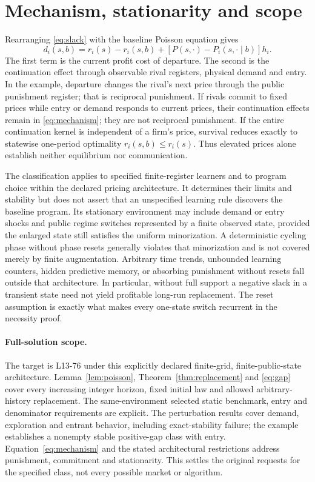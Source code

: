 \documentclass[11pt,a4paper]{article}
\begin{document}
\section{Mechanism, stationarity and scope}
Rearranging \eqref{eq:slack} with the baseline Poisson equation gives
\begin{equation}\label{eq:mechanism}
 d_i(s,b)=r_i(s)-r_i(s,b)
       +[P(s,\cdot)-P_i(s,\cdot\mid b)]h_i.
\end{equation}
The first term is the current profit cost of departure. The second is the
continuation effect through observable rival registers, physical demand and
entry. In the example, departure changes the rival's next price through the
public punishment register; that is reciprocal punishment. If rivals commit
to fixed prices while entry or demand responds to current prices, their
continuation effects remain in \eqref{eq:mechanism}; they are not reciprocal
punishment. If the entire continuation kernel is independent of a firm's
price, survival reduces exactly to statewise one-period optimality
$r_i(s,b)\leq r_i(s)$. Thus elevated prices alone establish neither equilibrium
nor communication.

The classification applies to specified finite-register learners and to program
choice within the declared pricing architecture. It determines their limits
and stability but does not assert that an unspecified learning rule discovers
the baseline program. Its stationary environment may include demand or entry
shocks and public regime switches represented by a finite observed state,
provided the enlarged state still satisfies the uniform minorization.
A deterministic cycling phase without phase resets generally violates that
minorization and is not covered merely by finite augmentation.
Arbitrary time trends, unbounded learning counters,
hidden predictive memory, or absorbing punishment without resets fall outside
that architecture. In particular, without full support a negative slack in a
transient state need not yield profitable long-run replacement. The reset
assumption is exactly what makes every one-state switch recurrent in the
necessity proof.

\paragraph{Full-solution scope.}
The target is L13-76 under this explicitly declared finite-grid, finite-public-state
architecture. Lemma~\ref{lem:poisson}, Theorem~\ref{thm:replacement} and
\eqref{eq:gap} cover every increasing integer horizon, fixed initial law and
allowed arbitrary-history replacement. The same-environment selected static
benchmark, entry and denominator requirements are explicit. The perturbation
results cover demand, exploration and entrant behavior, including exact-stability
failure; the example establishes a nonempty stable positive-gap class with
entry. Equation~\eqref{eq:mechanism} and the stated architectural restrictions
address punishment, commitment and stationarity. This settles the original
requests for the specified class, not every possible market or algorithm.
\end{document}
